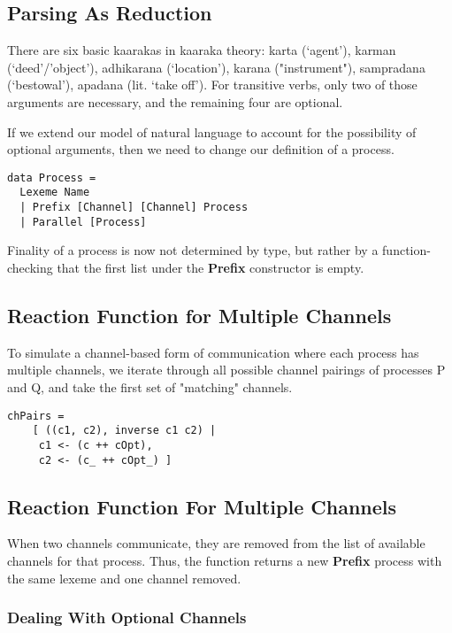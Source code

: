 \documentclass{article}
\begin{document}
\subsection{Parsing As Reduction}

There are six basic kaarakas in kaaraka theory: karta (‘agent’), karman (‘deed’/’object’), adhikarana (‘location’), karana ("instrument"), sampradana (‘bestowal’), apadana (lit. ‘take off’). For transitive verbs, only two of those arguments are necessary, and the remaining four are optional.

If we extend our model of natural language to account for the possibility of optional arguments, then we need to change our definition of a process.

\begin{lstlisting}
data Process =
  Lexeme Name
  | Prefix [Channel] [Channel] Process
  | Parallel [Process]
\end{lstlisting}

Finality of a process is now not determined by type, but rather by a function- checking that the first list under the \textbf{Prefix} constructor is empty.


\subsection{Reaction Function for Multiple Channels}

To simulate a channel-based form of communication where each process has multiple channels, we iterate through all possible channel pairings of processes P and Q, and take the first set of "matching" channels.

\begin{lstlisting}
chPairs = 
    [ ((c1, c2), inverse c1 c2) | 
     c1 <- (c ++ cOpt), 
     c2 <- (c_ ++ cOpt_) ]
\end{lstlisting}


\subsection{Reaction Function For Multiple Channels}

When two channels communicate, they are removed from the list of available channels for that process. Thus, the function returns a new \textbf{Prefix} process with the same lexeme and one channel removed.

\subsubsection{Dealing With Optional Channels}
\end{document}

